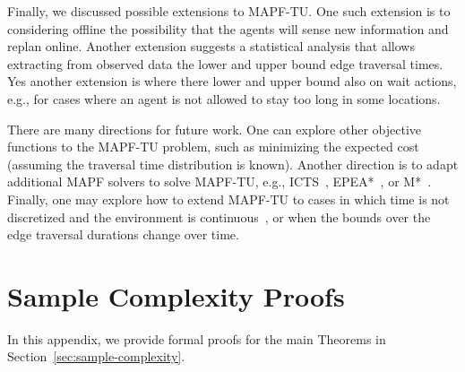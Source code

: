 \documentclass[jair,twoside,11pt,theapa]{article}
\newcommand{\mapftu}{MAPF-TU\xspace}
\begin{document}
Finally, we discussed possible extensions to \mapftu. One such extension is to considering offline the possibility that the agents will sense new information and replan online.  
Another extension suggests a statistical analysis that allows extracting from observed data the lower and upper bound edge traversal times. 
Yes another extension is where there lower and upper bound also on wait actions, e.g., for cases where an agent is not allowed to stay too long in some locations. %

There are many directions for future work. One can explore other objective functions to the \mapftu problem, such as minimizing the expected cost (assuming the traversal time distribution is known). Another direction is to adapt additional MAPF solvers to solve \mapftu, e.g., ICTS~, 
EPEA*~,
or M*~. Finally, one may explore how to extend \mapftu to cases in which time is not discretized and the environment is continuous~, or when the bounds over the edge traversal durations change over time. %



\appendix
\section{Sample Complexity Proofs}
\label{appendix:sample-complexity}

In this appendix, we provide formal proofs for the main Theorems in Section~\ref{sec:sample-complexity}.
\end{document}
